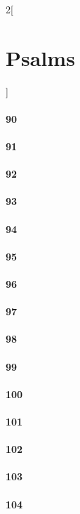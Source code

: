 \documentclass{book}
\begin{document}
\begin{multicols}{2}[\part{Psalms}]
\subsection*{90}
\subsection*{91}
\subsection*{92}
\subsection*{93}
\subsection*{94}
\subsection*{95}
\subsection*{96}
\subsection*{97}
\subsection*{98}
\subsection*{99}
\subsection*{100}
\subsection*{101}
\subsection*{102}
\subsection*{103}
\subsection*{104}

\end{multicols}
\end{document}
